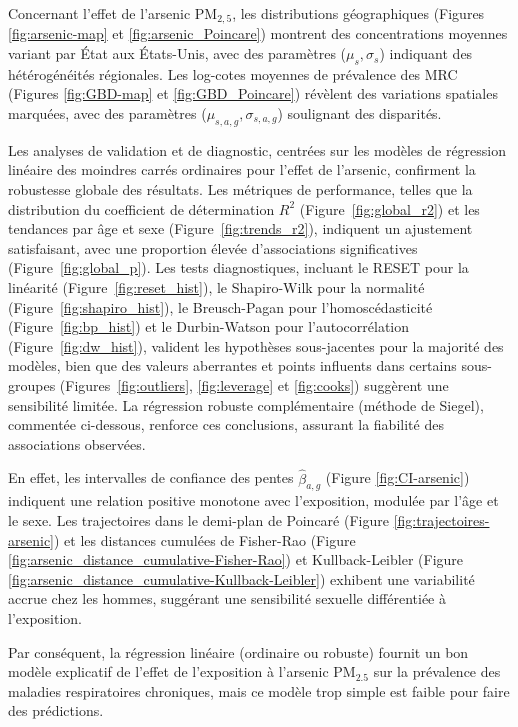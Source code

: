Concernant l'effet de l'arsenic PM$_{2,5}$, les distributions géographiques (Figures \ref{fig:arsenic-map} et \ref{fig:arsenic_Poincare}) montrent des concentrations moyennes variant par État aux États-Unis, avec des paramètres ($\mu_s, \sigma_s$) indiquant des hétérogénéités régionales. Les log-cotes moyennes de prévalence des MRC (Figures \ref{fig:GBD-map} et \ref{fig:GBD_Poincare}) révèlent des variations spatiales marquées, avec des paramètres ($\mu_{s,a,g}, \sigma_{s,a,g}$) soulignant des disparités. 

Les analyses de validation et de diagnostic, centrées sur les modèles de régression linéaire des moindres carrés ordinaires pour l'effet de l'arsenic, confirment la robustesse globale des résultats. Les métriques de performance, telles que la distribution du coefficient de détermination $R^2$ (Figure~\ref{fig:global_r2}) et les tendances par âge et sexe (Figure~\ref{fig:trends_r2}), indiquent un ajustement satisfaisant, avec une proportion élevée d'associations significatives (Figure~\ref{fig:global_p}). Les tests diagnostiques, incluant le RESET pour la linéarité (Figure~\ref{fig:reset_hist}), le Shapiro-Wilk pour la normalité (Figure~\ref{fig:shapiro_hist}), le Breusch-Pagan pour l'homoscédasticité (Figure~\ref{fig:bp_hist}) et le Durbin-Watson pour l'autocorrélation (Figure~\ref{fig:dw_hist}), valident les hypothèses sous-jacentes pour la majorité des modèles, bien que des valeurs aberrantes et points influents dans certains sous-groupes (Figures~\ref{fig:outliers}, \ref{fig:leverage} et \ref{fig:cooks}) suggèrent une sensibilité limitée. La régression robuste complémentaire (méthode de Siegel), commentée ci-dessous, renforce ces conclusions, assurant la fiabilité des associations observées.

 En effet, les intervalles de confiance des pentes $\hat{\beta}_{a,g}$ (Figure \ref{fig:CI-arsenic}) indiquent une relation positive monotone avec l'exposition, modulée par l'âge et le sexe. Les trajectoires dans le demi-plan de Poincaré (Figure \ref{fig:trajectoires-arsenic}) et les distances cumulées de Fisher-Rao (Figure \ref{fig:arsenic_distance_cumulative-Fisher-Rao}) et Kullback-Leibler (Figure \ref{fig:arsenic_distance_cumulative-Kullback-Leibler}) exhibent une variabilité accrue chez les hommes, suggérant une sensibilité sexuelle différentiée à l'exposition.

Par conséquent, la régression linéaire (ordinaire ou robuste) fournit un bon modèle explicatif de l’effet de l’exposition à l’arsenic PM$_{2.5}$ sur la prévalence des maladies respiratoires chroniques, mais ce modèle trop simple est faible pour faire des prédictions.

